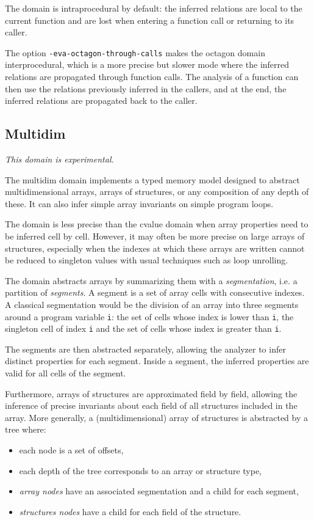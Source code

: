 \documentclass{frama-c-book}
\begin{document}
The domain is intraprocedural by default: the inferred relations are local to
the current function and are lost when entering a function call or returning
to its caller.

The option \verb+-eva-octagon-through-calls+ makes the octagon domain
interprocedural, which is a more precise but slower mode where
the inferred relations are propagated through function calls.
The analysis of a function can then use the relations previously inferred in the
callers, and at the end, the inferred relations are propagated back to the
caller.


\subsection{Multidim}
\label{sec:multidim}

\emph{This domain is experimental.}

The multidim domain implements a typed memory model designed to abstract
multidimensional arrays, arrays of structures, or any composition of any depth
of these. It can also infer simple array invariants on simple program loops.

The domain is less precise than the cvalue domain when array properties need
to be inferred cell by cell.
However, it may often be more precise on large arrays of structures, especially
when the indexes at which these arrays are written cannot be
reduced to singleton values with usual techniques such as loop unrolling.

The domain abstracts arrays by summarizing them with a {\it segmentation}, i.e. a
partition of {\it segments}. A segment is a set of array cells with consecutive
indexes. A classical segmentation would be the division of an array into three
segments around a program variable {\tt i}: the set of cells whose index is
lower than {\tt i}, the singleton cell of index {\tt i} and the set of cells
whose index is greater than {\tt i}.


The segments are then abstracted separately, allowing the analyzer to infer
distinct properties for each segment. Inside a segment, the inferred
properties are valid for all cells of the segment.

Furthermore, arrays of structures are approximated field by field, allowing the
inference of precise invariants about each field of all structures included in
the array. More generally, a (multidimensional) array of structures is
abstracted by a tree where:
\begin{itemize}
  \item each node is a set of offsets,
  \item each depth of the tree corresponds to an array or structure type,
  \item {\it array nodes} have an associated segmentation and a child for
        each segment,
  \item {\it structures nodes} have a child for each field of the structure.
\end{itemize}
\end{document}
